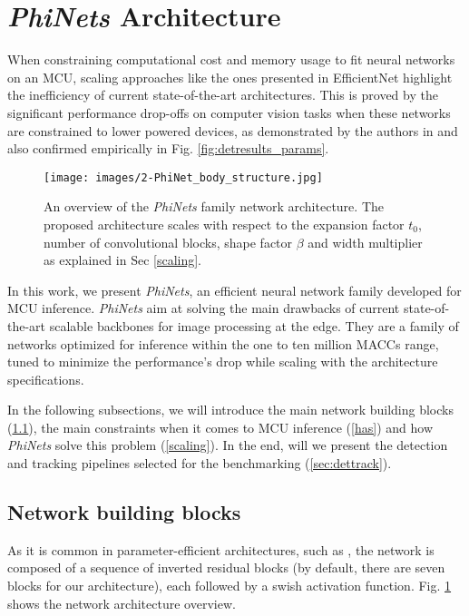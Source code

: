 \section{\textit{PhiNets} Architecture}

When constraining computational cost and memory usage to fit neural networks on an MCU, scaling approaches like the ones presented in EfficientNet highlight the inefficiency of current state-of-the-art architectures. This is proved by the significant performance drop-offs on computer vision tasks when these networks are constrained to lower powered devices, as demonstrated by the authors in \cite{howard2017mobilenets} and also confirmed empirically in Fig. \ref{fig:detresults_params}.

\begin{figure}[h]
  \centering
  \texttt{[image: images/2-PhiNet\_body\_structure.jpg]}
  \caption{An overview of the \textit{PhiNets} family network architecture. The proposed architecture scales with respect to the expansion factor $t_0$, number of convolutional blocks, shape factor $\beta$ and width multiplier as explained in Sec \ref{scaling}.}
  \label{fig:phinet_overview}
\end{figure}

In this work, we present \textit{PhiNets}, an efficient neural network family developed for MCU inference. \textit{PhiNets} aim at solving the main drawbacks of current state-of-the-art scalable backbones for image processing at the edge. They are a family of networks optimized for inference within the one to ten million MACCs range, tuned to minimize the performance's drop while scaling with the architecture specifications.


In the following subsections, we will introduce the main network building blocks (\ref{bblocks}), the main constraints when it comes to MCU inference (\ref{has}) and how \textit{PhiNets} solve this problem (\ref{scaling}). In the end, will we present the detection and tracking pipelines selected for the benchmarking (\ref{sec:dettrack}).

\subsection{Network building blocks}
\label{bblocks}
As it is common in parameter-efficient architectures, such as \cite{sandler2018mobilenetv2, tan2021efficientnetv2, he2016deep}, the network is composed of a sequence of inverted residual blocks (by default, there are seven blocks for our architecture), each followed by a swish activation function. Fig. \ref{fig:phinet_overview} shows the network architecture overview.

